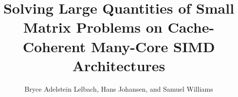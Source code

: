 \documentclass{sig-alternate-05-2015}
\begin{document}
\title{Solving Large Quantities of Small Matrix Problems on Cache-Coherent Many-Core SIMD Architectures}

\author{
\alignauthor
Bryce Adelstein Lelbach, Hans Johansen, and Samuel Williams\\
\\
\\
}


% 
\end{document}
